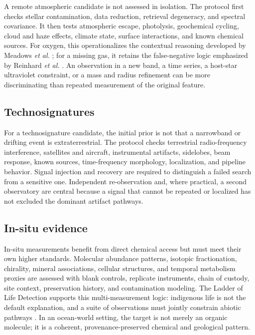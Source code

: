 \documentclass[conference]{IEEEtran}
\begin{document}
A remote atmospheric candidate is not assessed in isolation. The protocol first checks stellar contamination, data reduction, retrieval degeneracy, and spectral covariance. It then tests atmospheric escape, photolysis, geochemical cycling, cloud and haze effects, climate state, surface interactions, and known chemical sources. For oxygen, this operationalizes the contextual reasoning developed by Meadows \emph{et al.} \cite{meadows2018}; for a missing gas, it retains the false-negative logic emphasized by Reinhard \emph{et al.} \cite{reinhard2017}. An observation in a new band, a time series, a host-star ultraviolet constraint, or a mass and radius refinement can be more discriminating than repeated measurement of the original feature.

\subsection{Technosignatures}

For a technosignature candidate, the initial prior is not that a narrowband or drifting event is extraterrestrial. The protocol checks terrestrial radio-frequency interference, satellites and aircraft, instrumental artifacts, sidelobes, beam response, known sources, time-frequency morphology, localization, and pipeline behavior. Signal injection and recovery are required to distinguish a failed search from a sensitive one. Independent re-observation and, where practical, a second observatory are central because a signal that cannot be repeated or localized has not excluded the dominant artifact pathways.

\subsection{In-situ evidence}

In-situ measurements benefit from direct chemical access but must meet their own higher standards. Molecular abundance patterns, isotopic fractionation, chirality, mineral associations, cellular structures, and temporal metabolism proxies are assessed with blank controls, replicate instruments, chain of custody, site context, preservation history, and contamination modeling. The Ladder of Life Detection supports this multi-measurement logic: indigenous life is not the default explanation, and a suite of observations must jointly constrain abiotic pathways \cite{neveu2018}. In an ocean-world setting, the target is not merely an organic molecule; it is a coherent, provenance-preserved chemical and geological pattern.
\end{document}
